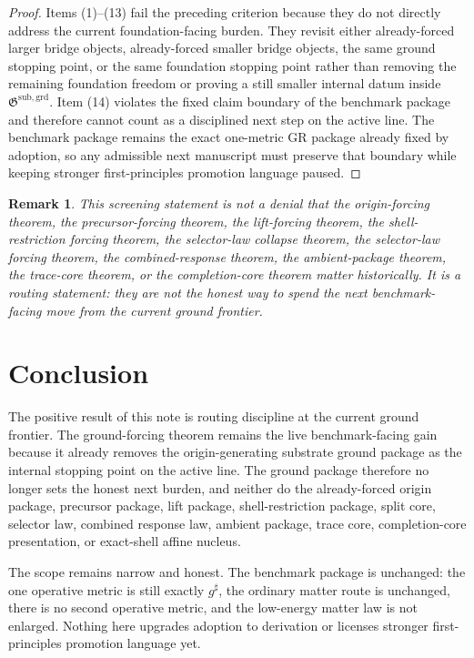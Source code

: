 \documentclass[11pt]{article}
\newcommand{\CompletedMetric}{g^{\sharp}}
\newcommand{\GroundPackage}{\mathfrak G^{\mathrm{sub,grd}}}
\newtheorem{remark}{Remark}
\begin{document}
\begin{proof}
Items (1)--(13) fail the preceding criterion because they do not directly address the current foundation-facing burden. They revisit either already-forced larger bridge objects, already-forced smaller bridge objects, the same ground stopping point, or the same foundation stopping point rather than removing the remaining foundation freedom or proving a still smaller internal datum inside \(\GroundPackage\). Item (14) violates the fixed claim boundary of the benchmark package and therefore cannot count as a disciplined next step on the active line. The benchmark package remains the exact one-metric GR package already fixed by adoption, so any admissible next manuscript must preserve that boundary while keeping stronger first-principles promotion language paused.
\end{proof}

\begin{remark}
This screening statement is not a denial that the origin-forcing theorem, the precursor-forcing theorem, the lift-forcing theorem, the shell-restriction forcing theorem, the selector-law collapse theorem, the selector-law forcing theorem, the combined-response theorem, the ambient-package theorem, the trace-core theorem, or the completion-core theorem matter historically. It is a routing statement: they are not the honest way to spend the next benchmark-facing move from the current ground frontier.
\end{remark}

\section{Conclusion}

The positive result of this note is routing discipline at the current ground frontier. The ground-forcing theorem remains the live benchmark-facing gain because it already removes the origin-generating substrate ground package as the internal stopping point on the active line. The ground package therefore no longer sets the honest next burden, and neither do the already-forced origin package, precursor package, lift package, shell-restriction package, split core, selector law, combined response law, ambient package, trace core, completion-core presentation, or exact-shell affine nucleus.

The scope remains narrow and honest. The benchmark package is unchanged: the one operative metric is still exactly \(\CompletedMetric\), the ordinary matter route is unchanged, there is no second operative metric, and the low-energy matter law is not enlarged. Nothing here upgrades adoption to derivation or licenses stronger first-principles promotion language yet.
\end{document}
